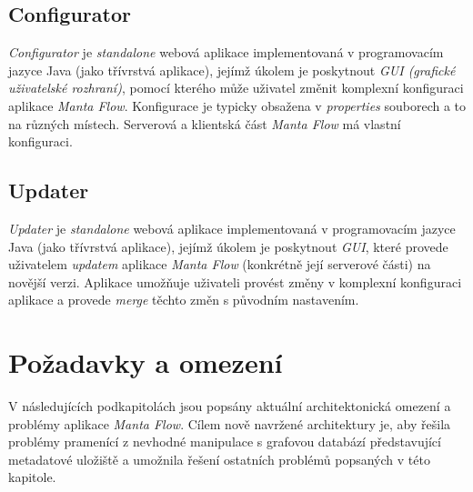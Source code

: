 \subsection{Configurator}
\label{sec:ana_configurator}
\textit{Configurator} je \textit{standalone} webová aplikace implementovaná v programovacím jazyce Java (jako třívrstvá aplikace), jejímž úkolem je poskytnout \textit{GUI (grafické uživatelské rozhraní)}, pomocí kterého může uživatel změnit komplexní konfiguraci aplikace \textit{Manta Flow}. Konfigurace je typicky obsažena v \textit{properties} souborech a to na různých místech. Serverová a klientská část \textit{Manta Flow} má vlastní konfiguraci. \cite{Molitor18}

\subsection{Updater}
\label{sec:ana_updater}
\textit{Updater} je \textit{standalone} webová aplikace implementovaná v programovacím jazyce Java (jako třívrstvá aplikace), jejímž úkolem je poskytnout \textit{GUI}, které provede uživatelem \textit{updatem} aplikace \textit{Manta Flow} (konkrétně její serverové části) na novější verzi. Aplikace umožňuje uživateli provést změny v komplexní konfiguraci aplikace a provede \textit{merge} těchto změn s původním nastavením. \cite{Gondek16}

\section{Požadavky a omezení}
\label{sec:ana_problems}
V následujících podkapitolách jsou popsány aktuální architektonická omezení a problémy aplikace \textit{Manta Flow}. Cílem nově navržené architektury je, aby řešila problémy pramenící z nevhodné manipulace s grafovou databází představující metadatové uložiště a umožnila řešení ostatních problémů popsaných v této kapitole.

